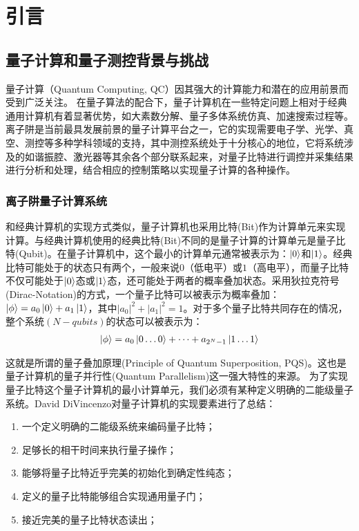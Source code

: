 
\chapter[引言]{引言\label{section:introduction}}
\section[离子阱量子测控背景与挑战]{量子计算和量子测控背景与挑战}
量子计算（Quantum Computing, QC）因其强大的计算能力和潜在的应用前景而受到广泛关注。
在量子算法的配合下，量子计算机在一些特定问题上相对于经典通用计算机有着显著优势，如大素数分解\cite[]{Shor_1997, Singleton_Jr_2023}、量子多体系统仿真\cite[]{Feynman_1982, Lloyd_1996}、加速搜索过程\cite[]{Grover_2002}等。
离子阱是当前最具发展前景的量子计算平台之一，它的实现需要电子学、光学、真空、测控等多种学科领域的支持，其中测控系统处于十分核心的地位，它将系统涉及的如谐振腔、激光器等其余各个部分联系起来，对量子比特进行调控并采集结果进行分析和处理，结合相应的控制策略以实现量子计算的各种操作。
\subsection[离子阱量子计算系统]{离子阱量子计算系统}
和经典计算机的实现方式类似，量子计算机也采用比特(Bit)作为计算单元来实现计算。与经典计算机使用的经典比特(Bit)不同的是量子计算的计算单元是量子比特(Qubit)。在量子计算机中，这个最小的计算单元通常被表示为：$\ket{0}$和$\ket{1}$。经典比特可能处于的状态只有两个，一般来说$0$（低电平）或$1$（高电平），而量子比特不仅可能处于$\ket{0}$态或$\ket{1}$态，还可能处于两者的概率叠加状态。采用狄拉克符号(Dirac-Notation)的方式，一个量子比特可以被表示为概率叠加：$\ket{\phi}=a_0\ket{0}+a_1\ket{1}$，其中$|a_0|^2+|a_1|^2=1$。对于多个量子比特共同存在的情况，整个系统$(N-qubits)$的状态可以被表示为：
\begin{align}
    \ket{\phi}=a_0\ket{0\dots0}+\dots+a_{2^N-1}\ket{1\dots1}\nonumber
\end{align}

这就是所谓的量子叠加原理(Principle of Quantum Superposition, PQS)\cite[]{Fedorov_Manko_2019}。这也是量子计算机的量子并行性(Quantum Parallelism)这一强大特性的来源。
为了实现量子比特这个量子计算机的最小计算单元，我们必须有某种定义明确的二能级量子系统。David DiVincenzo对量子计算机的实现要素进行了总结\cite[]{DiVincenzo_2000}：
\begin{enumerate}
    \item 一个定义明确的二能级系统来编码量子比特；
    \item 足够长的相干时间来执行量子操作；
    \item 能够将量子比特近乎完美的初始化到确定性纯态；
    \item 定义的量子比特能够组合实现通用量子门；
    \item 接近完美的量子比特状态读出；
\end{enumerate}

